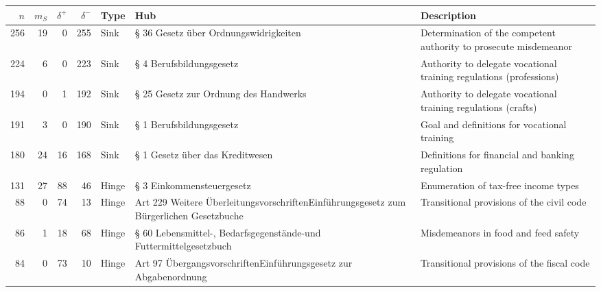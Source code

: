 \begin{tabular}{rrrrlp{}p{}}
\toprule
   $n$ &   $m_S$ &   $\delta^+$ &   $\delta^-$ & \textbf{Type}   & \textbf{Hub}                                                                            & \textbf{Description}   \\
\midrule
   256 &      19 &            0 &          255 & Sink            & § 36 Gesetz über Ordnungswidrigkeiten                                                   & Determination of the competent authority to prosecute misdemeanor   \\
   224 &       6 &            0 &          223 & Sink            & § 4 Berufsbildungsgesetz                                                                & Authority to delegate vocational training regulations (professions)                      \\
   194 &       0 &            1 &          192 & Sink            & § 25 Gesetz zur Ordnung des Handwerks                                                   & Authority to delegate vocational training regulations (crafts)                        \\
   191 &       3 &            0 &          190 & Sink            & § 1 Berufsbildungsgesetz                                                                & Goal and definitions for vocational training                      \\
   180 &      24 &           16 &          168 & Sink            & § 1 Gesetz über das Kreditwesen                                                         & Definitions for financial and banking regulation                       \\
   131 &      27 &           88 &           46 & Hinge           & § 3 Einkommensteuergesetz                                                               & Enumeration of tax-free income types                       \\
    88 &       0 &           74 &           13 & Hinge           & Art 229 Weitere Überleitungsvorschriften\newline Einführungsgesetz zum Bürgerlichen Gesetzbuche & Transitional provisions of the civil code                       \\
    86 &       1 &           18 &           68 & Hinge           & § 60 Lebensmittel-, Bedarfsgegenstände-\newline und Futtermittelgesetzbuch                      & Misdemeanors in food and feed safety                       \\
    84 &       0 &           73 &           10 & Hinge           & Art 97 Übergangsvorschriften\newline Einführungsgesetz zur Abgabenordnung                       & Transitional provisions of the fiscal code                       \\

\end{tabular}
